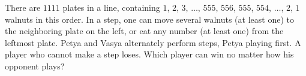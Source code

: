 \problem{}
There are $1111$ plates in a line, containing
$1$, $2$, $3$, $\ldots$, $555$, $556$, $555$, $554$, $\ldots$, $2$, $1$
walnuts in this order.
In a step, one can move several walnuts (at least one) to the neighboring plate on the
left, or eat any number (at least one) from the leftmost plate.
Petya and Vasya alternately perform steps, Petya playing first.
A player who cannot make a step loses.
Which player can win no matter how his opponent plays?
\solution
\endproblem
